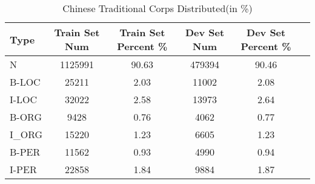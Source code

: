 \begin{table*}[htbp!]
    \centering
    \begin{tabular}{lccccc}
    \midrule
    Type  &  Train Set Num          & Train Set Percent \%         & Dev Set Num       & Dev Set Percent \%\\
    \midrule
    N     & 1125991       & 90.63               & 479394      & 90.46             \\
    B-LOC & 25211         & 2.03                & 11002       & 2.08              \\
    I-LOC & 32022         & 2.58                & 13973       & 2.64              \\
    B-ORG & 9428          & 0.76                & 4062        & 0.77              \\
    I_ORG & 15220         & 1.23                & 6605        & 1.23              \\
    B-PER & 11562         & 0.93                & 4990        & 0.94              \\
    I-PER & 22858         & 1.84                & 9884        & 1.87              \\

    \bottomrule
    \end{tabular}
\caption{Chinese Traditional Corps Distributed(in \%)}
\label{tab:text_cnn}
\end{table*}
